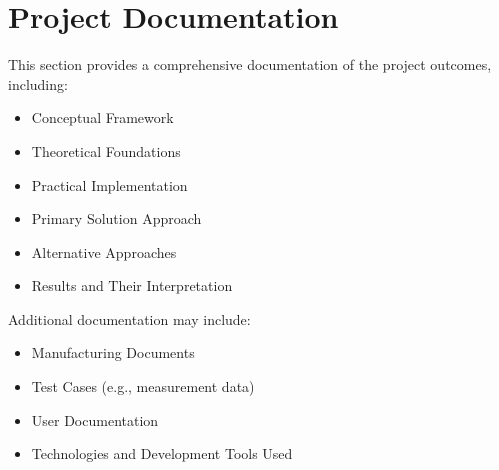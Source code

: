 \section{Project Documentation}

This section provides a comprehensive documentation of the project outcomes, including:

\begin{itemize}
    \item Conceptual Framework
    \item Theoretical Foundations
    \item Practical Implementation
    \item Primary Solution Approach
    \item Alternative Approaches
    \item Results and Their Interpretation
\end{itemize}

Additional documentation may include:

\begin{itemize}
    \item Manufacturing Documents
    \item Test Cases (e.g., measurement data)
    \item User Documentation
    \item Technologies and Development Tools Used
\end{itemize}



